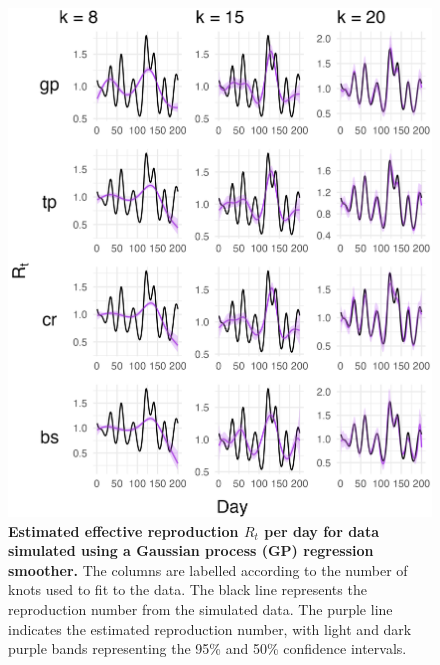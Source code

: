 \documentclass[
11pt, %
oneside, %
english, %
singlespacing, %
]{macthesis} %
\begin{document}
\begin{figure}[H]
\centering
\includegraphics[width=\textwidth]{figure/Simulated/unaggregated/simulation_gp_20_k(5,10,20)_bsd1_beta1_plot_R_t.png}
\caption[Estimated Simulated Data (GP) Effective Reproduction Number]{\textbf{Estimated effective reproduction \(R_t\) per day for data simulated using a Gaussian process (GP) regression smoother.} The columns are labelled according to the number of knots used to fit to the data. The black line represents the reproduction number from the simulated data. The purple line indicates the estimated reproduction number, with light and dark purple bands representing the 95\% and 50\% confidence intervals.}
\label{fig:Rt20gp}
\end{figure}
\end{document}
